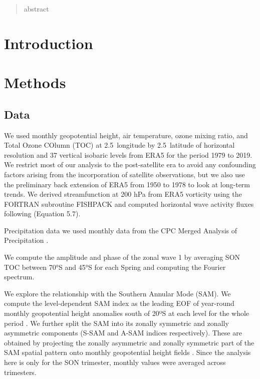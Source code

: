 \documentclass[smallextended]{svjour3}       %
\begin{document}
\begin{abstract}
abstract
\\
\keywords{
         \and
    }


\end{abstract}


\def\spacingset#1{\renewcommand{\baselinestretch}%
{#1}\small\normalsize} \spacingset{1}


\hypertarget{introduction}{%
\section{Introduction}\label{introduction}}

\hypertarget{methods}{%
\section{Methods}\label{methods}}

\hypertarget{data}{%
\subsection{Data}\label{data}}

We used monthly geopotential height, air temperature, ozone mixing ratio, and Total Ozone COlumn (TOC) at 2.5\degree~longitude by 2.5\degree~latitude of horizontal resolution and 37 vertical isobaric levels from ERA5 \citep{era5} for the period 1979 to 2019. We restrict most of our analysis to the post-satellite era to avoid any confounding factors arising from the incorporation of satellite observations, but we also use the preliminary back extension of ERA5 from 1950 to 1978 \citep{era5be} to look at long-term trends. We derived streamfunction at 200 hPa from ERA5 vorticity using the FORTRAN subroutine FISHPACK \citep{fishpack} and computed horizontal wave activity fluxes following \citet{plumb1985} (Equation 5.7).

Precipitation data we used monthly data from the CPC Merged Analysis of Precipitation \citep{cmap}.

We compute the amplitude and phase of the zonal wave 1 by averaging SON TOC between 70°S and 45°S for each Spring and computing the Fourier spectrum.

We explore the relationship with the Southern Annular Mode (SAM). We compute the level-dependent SAM index as the leading EOF of year-round monthly geopotential height anomalies south of 20ºS at each level for the whole period \citep{baldwin2009}. We further split the SAM into its zonally symmetric and zonally asymmetric components (S-SAM and A-SAM indices respectively). These are obtained by projecting the zonally asymmetric and zonally symmetric part of the SAM spatial pattern onto monthly geopotential height fields \citep{campitelli2021}. Since the analysis here is only for the SON trimester, monthly values were averaged across trimesters.
\end{document}
